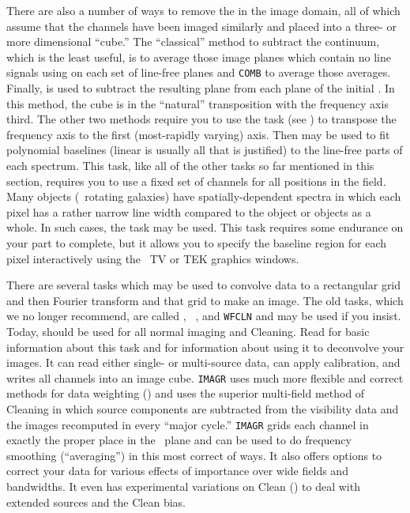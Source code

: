      There are also a number of ways to remove the  in
the image domain, all of which assume that the channels have been
imaged similarly and placed into a three- or more dimensional
``cube.''  The ``classical'' method to subtract the continuum, which
is the least useful, is to average those image planes which contain no
line signals using {\tt {}} on each set of line-free planes
and {\tt COMB} to average those averages.  Finally, {\tt {}}
is used to subtract the resulting plane from each plane of the initial
.  In this method, the cube is in the ``natural''
transposition with the frequency axis third.  The other two methods
require you to use the task {\tt {}} (see )
to transpose the frequency axis to the first (most-rapidly varying)
axis.  Then {\tt {}} may be used to fit polynomial baselines
(linear is usually all that is justified) to the line-free parts of
each spectrum.  This task, like all of the other tasks so far
mentioned in this section, requires you to use a fixed set of channels
for all positions in the field.  Many objects (\eg\ rotating galaxies)
have spatially-dependent spectra in which each pixel has a rather
narrow line width compared to the object or objects as a whole.  In
such cases, the task {\tt {}} may be used.  This task
requires some endurance on your part to complete, but it allows you to
specify the baseline region for each pixel interactively using the
\AIPS\ TV or TEK graphics windows.


     There are several tasks which may be used to convolve
 data to a rectangular grid and then Fourier
transform and  that grid to make an image.  The old tasks,
which we no longer recommend, are called {\tt {}}, {\tt
{}}, and {\tt WFCLN} and may be used if you insist.  Today,
{\tt {}} should be used for all normal imaging and Cleaning.
Read  for basic information about this task and 
for information about using it to deconvolve your images.  It can read
either single- or multi-source data, can apply calibration, and writes
all channels into an image cube.  {\tt IMAGR} uses much more flexible
and correct methods for data weighting () and uses the
superior multi-field method of Cleaning in which source components are
subtracted from the visibility data and the images recomputed in every
``major cycle.''  {\tt IMAGR} grids each channel in exactly the proper
place in the \uv\ plane and can be used to do frequency smoothing
(``averaging'') in this most correct of ways.  It also offers options
to correct your data for various effects of importance over wide
fields and bandwidths.  It even has experimental variations on Clean
() to deal with extended sources and the Clean bias.

